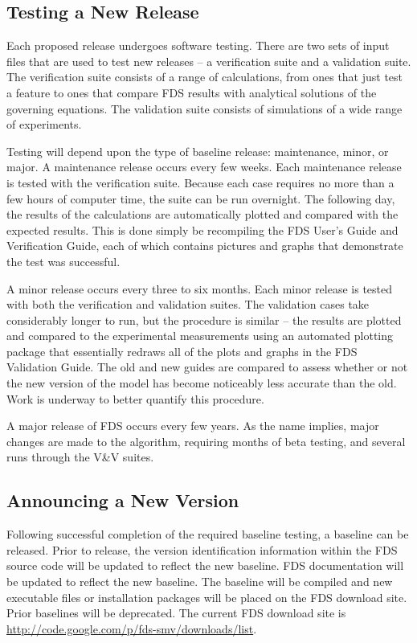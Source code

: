 \documentclass[11pt]{book}
\begin{document}
\subsection{Testing a New Release}

Each proposed release undergoes software testing.  There are two sets of input files that are used to test new releases --
a verification suite and a validation suite. The verification suite consists of a range of calculations, from ones that just test a feature to
ones that compare FDS results with analytical solutions of the governing equations. The validation suite consists of simulations of a wide range
of experiments.

Testing will depend upon the type of baseline release:
maintenance, minor, or major. A maintenance release occurs every few weeks.
Each maintenance release is tested with the verification suite. Because each case requires no more than a few
hours of computer time, the suite can be run overnight. The following day, the results of the calculations are automatically plotted and
compared with the expected results. This is done simply be recompiling the FDS User's Guide and Verification Guide, each of which contains pictures
and graphs that demonstrate the test was successful.

A minor release occurs every three to six months.
Each minor release is tested with both the verification and validation suites. The validation cases take considerably longer to run, but the
procedure is similar -- the results are plotted and compared to the experimental measurements using an automated plotting package that
essentially redraws all of the plots and graphs in the FDS Validation Guide. The old and new guides are compared to assess whether or not
the new version of the model has become noticeably less accurate than the old. Work is underway to better quantify this procedure.

A major release of FDS occurs every few years. As the name implies, major changes are made to the algorithm, requiring months of beta testing, and several
runs through the V\&V suites.


\subsection{Announcing a New Version}

Following successful completion of the required baseline testing, a baseline can be released.  Prior to release, the
version identification information within the FDS source code will be updated to reflect the new baseline.  FDS
documentation will be updated to reflect the new baseline.  The baseline will be compiled and new executable files
or installation packages will be placed on the FDS download site.  Prior baselines will be deprecated.  The
current FDS download site is \href{http://code.google.com/p/fds-smv/downloads/list}
{{\ct http://code.google.com/p/fds-smv/downloads/list}}.
\end{document}
